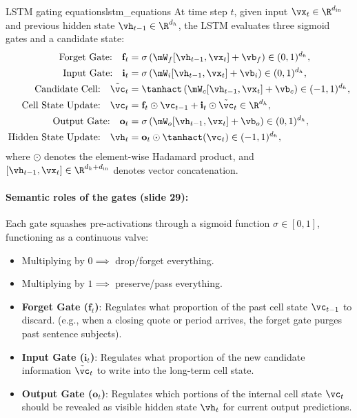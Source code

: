 \documentclass[../../main.tex]{subfiles}
\begin{document}
\begin{definition}{LSTM gating equations}{lstm_equations}
At time step $t$, given input $\vx_t \in \R^{d_{\text{in}}}$ and previous hidden state $\vh_{t-1} \in \R^{d_h}$, the LSTM evaluates three sigmoid gates and a candidate state:
\begin{align}
\text{Forget Gate:} \quad \mathbf{f}_t &= \sigma\left( \mW_f [\vh_{t-1}, \vx_t] + \vb_f \right) \in (0, 1)^{d_h}, \label{eq:lstm_forget} \\
\text{Input Gate:} \quad \mathbf{i}_t &= \sigma\left( \mW_i [\vh_{t-1}, \vx_t] + \vb_i \right) \in (0, 1)^{d_h}, \label{eq:lstm_input} \\
\text{Candidate Cell:} \quad \tilde{\vc}_t &= \tanhact\left( \mW_c [\vh_{t-1}, \vx_t] + \vb_c \right) \in (-1, 1)^{d_h}, \label{eq:lstm_candidate} \\
\text{Cell State Update:} \quad \vc_t &= \mathbf{f}_t \odot \vc_{t-1} + \mathbf{i}_t \odot \tilde{\vc}_t \in \R^{d_h}, \label{eq:lstm_highway} \\
\text{Output Gate:} \quad \mathbf{o}_t &= \sigma\left( \mW_o [\vh_{t-1}, \vx_t] + \vb_o \right) \in (0, 1)^{d_h}, \label{eq:lstm_output} \\
\text{Hidden State Update:} \quad \vh_t &= \mathbf{o}_t \odot \tanhact(\vc_t) \in (-1, 1)^{d_h}, \label{eq:lstm_hidden}
\end{align}
where $\odot$ denotes the element-wise Hadamard product, and $[\vh_{t-1}, \vx_t] \in \R^{d_h + d_{\text{in}}}$ denotes vector concatenation.
\end{definition}

\paragraph{Semantic roles of the gates (slide 29):}
Each gate squashes pre-activations through a sigmoid function $\sigma \in [0, 1]$, functioning as a continuous valve:
\begin{itemize}
    \item Multiplying by $0 \implies$ drop/forget everything.
    \item Multiplying by $1 \implies$ preserve/pass everything.
\end{itemize}
\begin{itemize}
    \item \textbf{Forget Gate ($\mathbf{f}_t$)}: Regulates what proportion of the past cell state $\vc_{t-1}$ to discard. (e.g., when a closing quote or period arrives, the forget gate purges past sentence subjects).
    \item \textbf{Input Gate ($\mathbf{i}_t$)}: Regulates what proportion of the new candidate information $\tilde{\vc}_t$ to write into the long-term cell state.
    \item \textbf{Output Gate ($\mathbf{o}_t$)}: Regulates which portions of the internal cell state $\vc_t$ should be revealed as visible hidden state $\vh_t$ for current output predictions.
\end{itemize}
\end{document}
